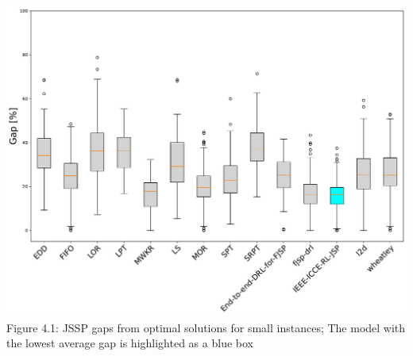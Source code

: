\begin{center}
    \includegraphics[width=0.8\linewidth]{images/horizontal_boxplot_jssp_small.pdf}\\
    Figure 4.1: JSSP gaps from optimal solutions for small instances; The model with the lowest average gap is highlighted as a blue box
\end{center}

